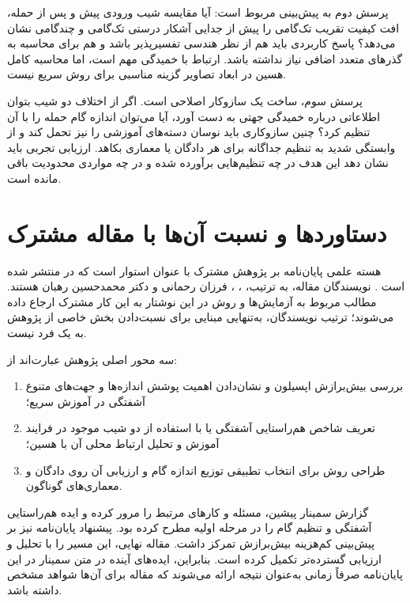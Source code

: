 پرسش دوم به پیش‌بینی مربوط است: آیا مقایسه شیب ورودی پیش و پس از حمله، افت کیفیت تقریب تک‌گامی را پیش از جدایی آشکار درستی تک‌گامی و چندگامی نشان می‌دهد؟ پاسخ کاربردی باید هم از نظر هندسی تفسیرپذیر باشد و هم برای محاسبه به گذرهای متعدد اضافی نیاز نداشته باشد. ارتباط با خمیدگی مهم است، اما محاسبه کامل هسین در ابعاد تصاویر گزینه مناسبی برای روش سریع نیست.

پرسش سوم، ساخت یک سازوکار اصلاحی است. اگر از اختلاف دو شیب بتوان اطلاعاتی درباره خمیدگی جهتی به دست آورد، آیا می‌توان اندازه گام حمله را با آن تنظیم کرد؟ چنین سازوکاری باید نوسان دسته‌های آموزشی را نیز تحمل کند و از وابستگی شدید به تنظیم جداگانه برای هر دادگان یا معماری بکاهد. ارزیابی تجربی باید نشان دهد این هدف در چه تنظیم‌هایی برآورده شده و در چه مواردی محدودیت باقی مانده است.

\section{دستاوردها و نسبت آن‌ها با مقاله مشترک}
هسته علمی پایان‌نامه بر پژوهش مشترک با عنوان
استوار است که در  منتشر شده است \cite{sora2026}. نویسندگان مقاله، به ترتیب، ، ، فرزان رحمانی و دکتر محمدحسین رهبان هستند. مطالب مربوط به آزمایش‌ها و روش \sora{} در این نوشتار به این کار مشترک ارجاع داده می‌شوند؛ ترتیب نویسندگان، به‌تنهایی مبنایی برای نسبت‌دادن بخش خاصی از پژوهش به یک فرد نیست.

سه محور اصلی پژوهش عبارت‌اند از:
\begin{enumerate}
\item بررسی بیش‌برازش اپسیلون و نشان‌دادن اهمیت پوشش اندازه‌ها و جهت‌های متنوع آشفتگی در آموزش سریع؛
\item تعریف شاخص هم‌راستایی آشفتگی یا \pertalign{} با استفاده از دو شیب موجود در فرایند آموزش و تحلیل ارتباط محلی آن با هسین؛
\item طراحی روش \sora{} برای انتخاب تطبیقی توزیع اندازه گام و ارزیابی آن روی دادگان و معماری‌های گوناگون.
\end{enumerate}

گزارش سمینار پیشین، مسئله و کارهای مرتبط را مرور کرده و ایده هم‌راستایی آشفتگی و تنظیم گام را در مرحله اولیه مطرح کرده بود. پیشنهاد پایان‌نامه نیز بر پیش‌بینی کم‌هزینه بیش‌برازش تمرکز داشت. مقاله نهایی، این مسیر را با تحلیل و ارزیابی گسترده‌تر تکمیل کرده است. بنابراین، ایده‌های آینده در متن سمینار در این پایان‌نامه صرفاً زمانی به‌عنوان نتیجه ارائه می‌شوند که مقاله برای آن‌ها شواهد مشخص داشته باشد.

